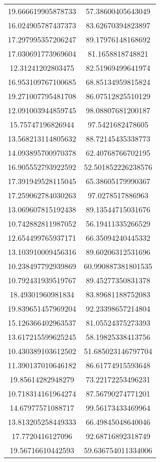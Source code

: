 \begin{table}
\begin{tabular}{cc}
19.666619905878733 & 57.38600405643049 \\
16.024905787437373 & 83.62670394823897 \\
17.297995357206247 & 89.17976148168692 \\
17.030691773969604 & 81.1658818748821 \\
12.31241202803475 & 82.51969499641974 \\
16.953109767100685 & 68.85134959815824 \\
19.271007795481708 & 86.07512825510129 \\
12.091003944859745 & 98.08807681200187 \\
15.75747196826944 & 97.5421682478605 \\
13.568213114805632 & 88.72145435338773 \\
14.093895700970378 & 62.40768766702195 \\
16.905552793922592 & 52.501852226238576 \\
17.391949528115045 & 65.38605179990367 \\
17.259062784030263 & 97.0278517886963 \\
13.069607815192438 & 89.13544715031676 \\
10.742882811987052 & 56.19411335266529 \\
12.654499765937171 & 66.35094240445332 \\
13.103910009456316 & 89.60206312531696 \\
10.238497792939869 & 60.990887381801535 \\
10.792431939519767 & 89.45277350831378 \\
18.49301960981834 & 83.89681188752083 \\
19.839651457969204 & 92.23398657214804 \\
15.126366402963537 & 81.05524375273393 \\
13.617215599625245 & 58.19825338413756 \\
10.430389103612502 & 51.685023146797704 \\
11.390137010646182 & 86.61774915593648 \\
19.85614282948279 & 73.22172253496231 \\
10.718314161964274 & 87.56790274771201 \\
14.67977571088717 & 99.56173433469964 \\
13.813205258449333 & 66.49845048640046 \\
17.7720416127096 & 92.68716892318749 \\
19.56716610442593 & 59.636754011334006 \\

\end{tabular}
\end{table}
